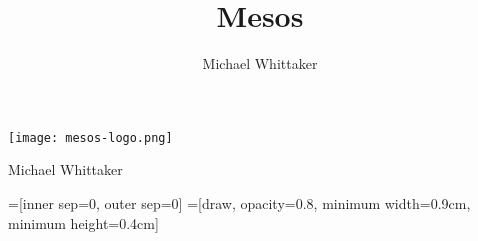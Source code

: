 \documentclass{beamer}
\title{Mesos}
\author{Michael Whittaker}
\begin{document}
\begin{frame}
  \texttt{[image: mesos-logo.png]}

  \begin{center}
    Michael Whittaker
  \end{center}
\end{frame}

=[inner sep=0, outer sep=0]
=[draw, opacity=0.8, minimum width=0.9cm, minimum height=0.4cm]

\newcommand{\red}{red!50}
\newcommand{\orange}{orange!50}
\newcommand{\green}{green!50}
\newcommand{\blue}{blue!50}
\newcommand{\purple}{purple!50}
\newcommand{\black}{black!50}

\newcommand{\boundingbox}{
  \path (0, -1) grid (8.5, 7);
}

\newcommand{\drawserver}[3]{
  \node[server] (s#1) at (#2, #3) {\texttt{[image: server.png]}};
}

\newcommand{\drawslots}[6]{
  \drawserver{#1}{#2}{#3};
  \node[slot, fill=#4] (s#1.0) at (#2, #3+0.5) {};
  \node[slot, fill=#5] (s#1.1) at (#2, #3    ) {};
  \node[slot, fill=#6] (s#1.2) at (#2, #3-0.5) {};
}

\newcommand{\oneslot}[3]{
  \draw[fill=#3] (#1, #2) rectangle (#1 + 0.4, #2 + 0.9);
}

\newcommand{\twoslots}[4]{
  \oneslot{#1}{#2}{#3}
  \oneslot{#1 + 0.5}{#2}{#4}
}

\newcommand{\threeslots}[5]{
  \oneslot{#1}{#2}{#3}
  \oneslot{#1 + 0.5}{#2}{#4}
  \oneslot{#1 + 1.0}{#2}{#5}
}

\newcommand{\fourslots}[6]{
  \oneslot{#1}{#2}{#3}
  \oneslot{#1 + 0.5}{#2}{#4}
  \oneslot{#1 + 1.0}{#2}{#5}
  \oneslot{#1 + 1.5}{#2}{#6}
}

\newcommand{\hadoopone}{
  \node[
    draw,
    minimum width=5cm, minimum height=3cm,
    label={[shift={(0, -1cm)}]north:Hadoop}
  ] (hadoop) at (5, 4.5) {};
  \foreach \i in {0, ..., 5} {
    \draw (hadoop) -- (s\i);
  }
}
\end{document}
